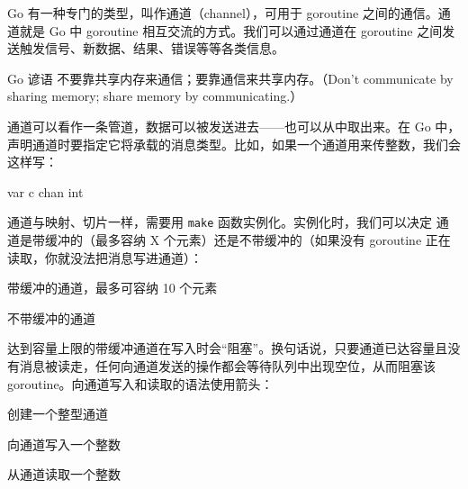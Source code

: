 Go 有一种专门的类型，叫作通道（channel），可用于 goroutine 之间的通信。通道就是 Go 中 goroutine 相互交流的方式。我们可以通过通道在 goroutine 之间发送触发信号、新数据、结果、错误等等各类信息。

\begin{tipbox}{Go 谚语}
不要靠共享内存来通信；要靠通信来共享内存。（Don't communicate by sharing memory; share memory by communicating.）
\end{tipbox}

通道可以看作一条管道，数据可以被发送进去——也可以从中取出来。在 Go 中，声明通道时要指定它将承载的消息类型。比如，如果一个通道用来传整数，我们会这样写：

\begin{gocode}[]
var c chan int
\end{gocode}

通道与映射、切片一样，需要用 \texttt{make} 函数实例化。实例化时，我们可以决定
通道是带缓冲的（最多容纳 X 个元素）还是不带缓冲的（如果没有 goroutine 正在读取，你就没法把消息写进通道）：


\begin{codeannotations}
\item 带缓冲的通道，最多可容纳 10 个元素
\item 不带缓冲的通道
\end{codeannotations}

达到容量上限的带缓冲通道在写入时会``阻塞''。换句话说，只要通道已达容量且没有消息被读走，任何向通道发送的操作都会等待队列中出现空位，从而阻塞该 goroutine。向通道写入和读取的语法使用箭头：


\begin{codeannotations}
\item 创建一个整型通道
\item 向通道写入一个整数
\item 从通道读取一个整数
\end{codeannotations}

